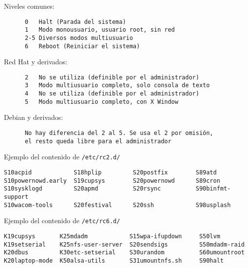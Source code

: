 \documentclass[ucs]{beamer}
\begin{document}
\begin{frame}[fragile]
Niveles comunes:
\begin{scriptsize}
\begin{verbatim}
      0   Halt (Parada del sistema)
      1   Modo monousuario, usuario root, sin red
      2-5 Diversos modos multiusuario
      6   Reboot (Reiniciar el sistema) 
\end{verbatim}
\end{scriptsize}

Red Hat y derivados:
\begin{scriptsize}
\begin{verbatim}
      2   No se utiliza (definible por el administrador)
      3   Modo multiusuario completo, solo consola de texto
      4   No se utiliza (definible por el administrador)
      5   Modo multiusuario completo, con X Window
\end{verbatim}
\end{scriptsize}

Debian y derivados:

\begin{scriptsize}
\begin{verbatim}
      No hay diferencia del 2 al 5. Se usa el 2 por omisión,
      el resto queda libre para el administrador
\end{verbatim}
\end{scriptsize}

\end{frame}


\begin{frame}[fragile]

Ejemplo del contenido de \verb|/etc/rc2.d/|

\begin{scriptsize}
\begin{verbatim}
S10acpid            S18hplip         S20postfix        S89atd              
S10powernowd.early  S19cupsys        S20powernowd      S89cron
S10sysklogd         S20apmd          S20rsync          S90binfmt-support
S10wacom-tools      S20festival      S20ssh            S98usplash
\end{verbatim}
\end{scriptsize}

Ejemplo del contenido de \verb|/etc/rc6.d/|
\begin{scriptsize}
\begin{verbatim}
K19cupsys       K25mdadm            S15wpa-ifupdown     S50lvm
K19setserial    K25nfs-user-server  S20sendsigs         S50mdadm-raid
K20dbus         K30etc-setserial    S30urandom          S60umountroot
K20laptop-mode  K50alsa-utils       S31umountnfs.sh     S90halt
\end{verbatim}
\end{scriptsize}


\end{frame}
\end{document}
